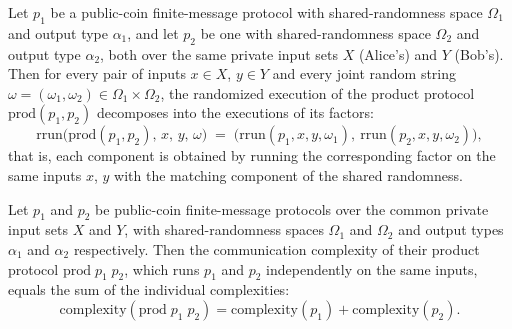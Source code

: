 \begin{theorem}
\label{CommunicationComplexity.PublicCoin.FiniteMessage.Protocol.prod_rrun}
\leanok
{}
Let $p_1$ be a public-coin finite-message protocol with shared-randomness space
$\Omega_1$ and output type $\alpha_1$, and let $p_2$ be one with shared-randomness space
$\Omega_2$ and output type $\alpha_2$, both over the same private input sets $X$
(Alice's) and $Y$ (Bob's). Then for every pair of inputs $x \in X$, $y \in Y$ and every
joint random string $\omega = (\omega_1, \omega_2) \in \Omega_1 \times \Omega_2$, the
randomized execution of the product protocol $\mathrm{prod}(p_1, p_2)$ decomposes into
the executions of its factors:
\[
\mathrm{rrun}\bigl(\mathrm{prod}(p_1, p_2),\, x,\, y,\, \omega\bigr) \;=\;
\bigl(\mathrm{rrun}(p_1, x, y, \omega_1),\ \mathrm{rrun}(p_2, x, y, \omega_2)\bigr),
\]
that is, each component is obtained by running the corresponding factor on the same
inputs $x$, $y$ with the matching component of the shared randomness.
\end{theorem}

\begin{theorem}
\label{CommunicationComplexity.PublicCoin.FiniteMessage.Protocol.prod_complexity}
\leanok
{}
Let $p_1$ and $p_2$ be public-coin finite-message protocols over the common private
input sets $X$ and $Y$, with shared-randomness spaces $\Omega_1$ and $\Omega_2$ and
output types $\alpha_1$ and $\alpha_2$ respectively. Then the communication complexity
of their product protocol $\mathrm{prod}\;p_1\;p_2$, which runs $p_1$ and $p_2$
independently on the same inputs, equals the sum of the individual complexities:
\[
\mathrm{complexity}(\mathrm{prod}\;p_1\;p_2) = \mathrm{complexity}(p_1) +
\mathrm{complexity}(p_2).
\]
\end{theorem}

